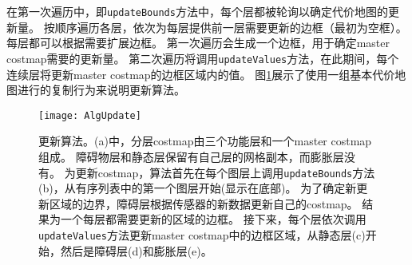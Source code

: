 在第一次遍历中，即\texttt{updateBounds}方法中，每个层都被轮询以确定代价地图的更新量。 按顺序遍历各层，依次为每层提供前一层需要更新的边框（最初为空框）。 每层都可以根据需要扩展边框。 第一次遍历会生成一个边框，用于确定master costmap需要的更新量。 第二次遍历将调用\texttt{updateValues}方法，在此期间，每个连续层将更新master costmap的边框区域内的值。 图\ref{fig:costMap:updateAlg}展示了使用一组基本代价地图进行的复制行为来说明更新算法。

\begin{figure}[!htb]
	\centering
	\texttt{[image: AlgUpdate]}
	\caption{更新算法。(a)中，分层costmap由三个功能层和一个master costmap组成。 障碍物层和静态层保留有自己层的网格副本，而膨胀层没有。 为更新costmap，算法首先在每个图层上调用\texttt{updateBounds}方法 (b)，从有序列表中的第一个图层开始(显示在底部)。 为了确定新更新区域的边界，障碍层根据传感器的新数据更新自己的costmap。 结果为一个每层都需要更新的区域的边框。 接下来，每个层依次调用\texttt{updateValues}方法更新master costmap中的边框区域，从静态层(c)开始，然后是障碍层(d)和膨胀层(e)。}
	\label{fig:costMap:updateAlg}
\end{figure}


%

